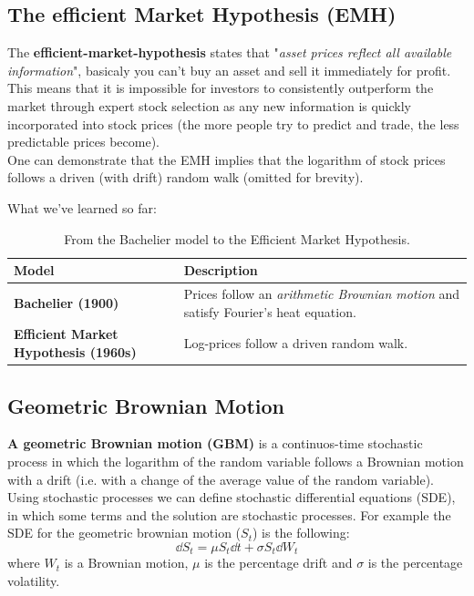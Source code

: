 \subsection{The efficient Market Hypothesis (EMH)}
The \textbf{efficient-market-hypothesis} states that "\textit{asset prices reflect all available information}", basicaly you can't buy an asset and sell it immediately for profit.\\
This means that it is impossible for investors to consistently outperform the market through expert stock selection as any new information is quickly incorporated into stock prices (the more people try to predict and trade, the less predictable prices become).\\

 One can demonstrate that the EMH implies that the logarithm of stock prices follows a driven (with drift) random walk (omitted for brevity).

What we've learned so far:

\begin{table}[H]
\centering
{}
\begin{tabular}{@{}p{4cm}p{8.5cm}@{}}
\toprule
\rowcolor{gray!15}
\textbf{Model} & \textbf{Description} \\ \midrule
\textbf{Bachelier (1900)} &
Prices follow an \emph{arithmetic Brownian motion} and satisfy Fourier's heat equation. \\[3pt]
\textbf{Efficient Market Hypothesis (1960s)} &
Log-prices follow a driven random walk. \\ 
\bottomrule
\end{tabular}
\caption{From the Bachelier model to the Efficient Market Hypothesis.}
\end{table}

\subsection{Geometric Brownian Motion}

\textbf{A geometric Brownian motion (GBM)} is a continuos-time stochastic process in which the logarithm of the random variable follows a Brownian motion with a drift (i.e. with a change of the average value of the random variable). \\
Using stochastic processes we can define stochastic differential equations (SDE), in which some terms and the solution are stochastic processes.
For example the SDE for the geometric brownian motion ($S_{t}$) is the following:
\begin{equation*}
    \dd S_{t} = \mu S_{t} \dd t + \sigma S_{t} \dd W_{t}
\end{equation*}
where $W_{t}$ is a Brownian motion, $\mu$ is the percentage drift and $\sigma$ is the percentage volatility.

